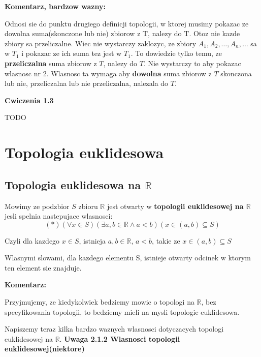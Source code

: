 \documentclass{article}
\begin{document}
\textbf{Komentarz, bardzow wazny:}

Odnosi sie do punktu drugiego definicji topologii, w ktorej musimy pokazac ze dowolna suma(skonczone lub nie) zbiorow z T, nalezy do T. Otoz nie kazde zbiory sa przeliczalne. Wiec nie wystarczy zaklozyc, ze zbiory $A_{1}, A_{2}, \dots, A_{n}, \dots$ sa w $T_{1}$ i pokazac ze ich suma tez jest w $T_{1}$. To dowiedzie tylko temu, ze \textbf{przeliczalna} suma zbiorow z $T$, nalezy do $T$. Nie wystarczy to aby pokazac wlasnosc nr 2. Wlasnosc ta wymaga aby \textbf{dowolna} suma zbiorow z $T$ skonczona lub nie, przeliczalna lub nie przeliczalna, nalezala do $T$. 

\hrulefill

\textbf{Cwiczenia 1.3}

TODO

\hrulefill

\section{Topologia euklidesowa}
\subsection{Topologia euklidesowa na $\mathbb{R}$}

\begin{tcolorbox}[colback=white!90!red,colframe=black!35!red,title=2.1.1 Definicja: Topologia euklidesowa na $\mathbb{R}$]
    Mowimy ze podzbior $S$ zbioru $\mathbb{R}$ jest otwarty w \textbf{topologii euklidesowej na $\mathbb{R}$} jesli spelnia nastepujace wlasnosci:
    $$(*)(\forall x \in S)(\exists a,b \in \mathbb{R}\land a<b)(x \in (a,b) \subseteq S)$$

    Czyli dla kazdego $x \in S$, istnieja $a,b \in \mathbb{R}$, $a<b$, takie ze $x \in (a,b) \subseteq S$

    Wlasnymi slowami, dla kazdego elementu S, istnieje otwarty odcinek w ktorym ten element sie znajduje.
\end{tcolorbox}

\textbf{Komentarz:}

Przyjmujemy, ze kiedykolwiek bedziemy mowic o topologi na $\mathbb{R}$, bez specyfikowania topologii, to bedziemy mieli na mysli topologie euklidesowa.

Napiszemy teraz kilka bardzo waznych wlasnosci dotyczacych topologi euklidesowej na $\mathbb{R}$.
\textbf{Uwaga 2.1.2 Wlasnosci topologii euklidesowej(niektore)}
\end{document}
